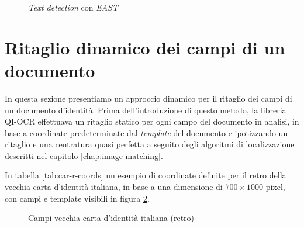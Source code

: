 \begin{figure}[h]
{{{			}
		}
	}
	\caption{\textit{Text detection} con \textit{EAST}} \label{fig:east}
\end{figure}


\section{Ritaglio dinamico dei campi di un documento}
In questa sezione presentiamo un approccio dinamico per il ritaglio dei campi di un documento d'identit\`a. Prima dell'introduzione di questo metodo, la libreria QI-OCR effettuava un ritaglio statico per ogni campo del documento in analisi, in base a coordinate predeterminate dal \textit{template} del documento e ipotizzando un ritaglio e una centratura quasi perfetta a seguito degli algoritmi di localizzazione descritti nel capitolo \ref{chap:image-matching}.\par
In tabella \ref{tab:car-r-coords} un esempio di coordinate definite per il retro della vecchia carta d'identit\`a italiana, in base a una dimensione di $700 \times 1000$ pixel, con campi e template visibili in figura \ref{fig:car-r-template}.\par
\begin{figure}[h]
	\centering
	\caption{Campi vecchia carta d'identit\`a italiana (retro)} \label{fig:car-r-template}
\end{figure}
